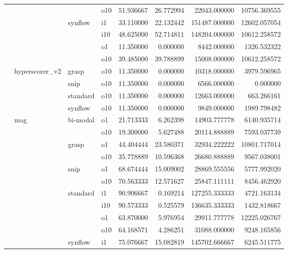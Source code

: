 \begin{longtable}{llllrrrr}
      &     &         & o10 &  51.936667 &  26.772994 &     22043.000000 &  10756.369555 \\
      &     & synflow & i1 &  33.110000 &  22.132442 &    151487.000000 &  12602.057054 \\
      &     &         & i10 &  48.625000 &  52.714811 &    148204.000000 &  10612.258572 \\
      &     &         & o1 &  11.350000 &   0.000000 &      8442.000000 &   1326.532322 \\
      &     &         & o10 &  39.485000 &  39.788899 &     15008.000000 &  10612.258572 \\
      & hyperscorer\_v2 & grasp & o10 &  11.350000 &   0.000000 &     10318.000000 &   3979.596965 \\
      &     & snip & o10 &  11.350000 &   0.000000 &      6566.000000 &      0.000000 \\
      &     & standard & o10 &  11.350000 &   0.000000 &     12663.000000 &    663.266161 \\
      &     & synflow & o10 &  11.350000 &   0.000000 &      9849.000000 &   1989.798482 \\
      & mag & bi-modal & o1 &  21.713333 &   6.262398 &     14903.777778 &   6140.935714 \\
      &     &         & o10 &  19.300000 &   5.627488 &     20114.888889 &   7593.037739 \\
      &     & grasp & o1 &  44.404444 &  23.580371 &     32934.222222 &  10801.717014 \\
      &     &         & o10 &  35.778889 &  10.596368 &     26680.888889 &   9567.038001 \\
      &     & snip & o1 &  68.674444 &  15.009002 &     28869.555556 &   5777.992020 \\
      &     &         & o10 &  70.563333 &  12.571627 &     25847.111111 &   8456.462920 \\
      &     & standard & i1 &  90.906667 &   0.169214 &    127255.333333 &   4721.163134 \\
      &     &         & i10 &  90.573333 &   0.525579 &    136635.333333 &   1432.818667 \\
      &     &         & o1 &  63.870000 &   5.976954 &     29911.777778 &  12225.026767 \\
      &     &         & o10 &  64.168571 &   4.286251 &     31088.000000 &   9248.165856 \\
      &     & synflow & i1 &  75.076667 &  15.082819 &    145702.666667 &   6245.511775 \\

\end{longtable}
